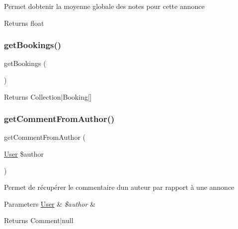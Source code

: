 Permet d\textquotesingle{}obtenir la moyenne globale des notes pour cette annonce

\begin{DoxyReturn}{Returns}
float 
\end{DoxyReturn}
\mbox{\label{class_app_1_1_entity_1_1_ad_a3dba7af3ac89f0c7c191024c2bcbf2e5}} 
\subsubsection{\texorpdfstring{getBookings()}{getBookings()}}
{\footnotesize\ttfamily get\+Bookings (\begin{DoxyParamCaption}{ }\end{DoxyParamCaption})}

\begin{DoxyReturn}{Returns}
Collection$\vert$\+Booking\mbox{[}\mbox{]} 
\end{DoxyReturn}
\mbox{\label{class_app_1_1_entity_1_1_ad_a6d4d0d9397a52554927e969a43c5d097}} 
\subsubsection{\texorpdfstring{getCommentFromAuthor()}{getCommentFromAuthor()}}
{\footnotesize\ttfamily get\+Comment\+From\+Author (\begin{DoxyParamCaption}\item[{\mbox{\hyperlink{class_app_1_1_entity_1_1_user}{User}}}]{\$author }\end{DoxyParamCaption})}

Permet de récupérer le commentaire d\textquotesingle{}un auteur par rapport à une annonce


\begin{DoxyParams}[1]{Parameters}
\mbox{\hyperlink{class_app_1_1_entity_1_1_user}{User}} & {\em \$author} & \\
\hline
\end{DoxyParams}
\begin{DoxyReturn}{Returns}
Comment$\vert$null 
\end{DoxyReturn}
\mbox{\label{class_app_1_1_entity_1_1_ad_af3034ead082330d2c046a69814009808}} 
